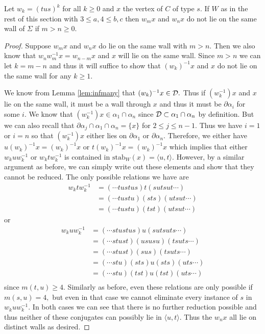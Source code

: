 \documentclass[class=book, crop=false,12 pt]{standalone}
\begin{document}
\begin{lemma}
	\label{lem:samewall}
	Let $w_k=(tus)^k$ for all $k\ge 0$ and $x$ the vertex of $C$ of type $s.$ If $W$ as in the rest of this section with $3\le a,4\le b,c$ then $w_mx$ and $w_nx$ do not lie on the same wall of $\Sigma$ if $m>n\ge 0.$
\end{lemma}
\begin{proof}
	Suppose $w_mx$ and $w_nx$ do lie on the same wall with $m>n.$ Then we also know that $w_nw^{-1}_mx=w_{n-m}x$ and $x$ will lie on the same wall. Since $m>n$ we can let $k=m-n$ and thus it will suffice to show that $(w_k)^{-1}x$ and $x$ do not lie on the same wall for any $k\ge 1.$
	
We know from Lemma \ref{lem:infmany} that $(w_k)^{-1}x\in \mathcal{D}.$ Thus if $(w_k^{-1})x$ and $x$ lie on the same wall, it must be a wall through $x$ and thus it must be $\partial\alpha_i$ for some $i.$ We know that $(w_k^{-1})x\in \alpha_1\cap \alpha_n$ since $\mathcal{D}\subset \alpha_1\cap \alpha_n$ by definition. But we can also recall that $\partial\alpha_j\cap \alpha_1\cap \alpha_n=\{x\}$ for $2\le j\le n-1.$ Thus we have $i=1$ or $i=n$ so that $(w_k^{-1})x$ either lies on $\partial\alpha_1$ or $\partial\alpha_n.$  Therefore, we either have $u(w_k)^{-1}x=(w_k)^{-1}x$ or $t(w_k)^{-1}x=(w_k)^{-1}x$ which implies that either $w_kuw_k^{-1}$ or $w_ktw_k^{-1}$ is contained in $\mathrm{stab}_W(x)=\langle u,t \rangle.$ However, by a similar argument as before, we can simply write out these elements and show that they cannot be reduced. The only possible relations we have are
\begin{align*}
	w_ktw_k^{-1}&=(\cdots tustus)t(sutsut\cdots)\\
		    &=(\cdots tustu)(sts)(utsut\cdots)\\
		    &=(\cdots tustu)(tst)(utsut\cdots)
\end{align*}
or
\begin{align*}
	w_kuw_k^{-1}&=(\cdots stustus)u(sutsuts\cdots)\\
		    &=(\cdots stust)(ususu)(tsuts\cdots)\\
		    &=(\cdots stust)(sus)(tsuts\cdots)\\
		    &=(\cdots stu)(sts)u(sts)(uts\cdots)\\
		    &=(\cdots stu)(tst)u(tst)(uts\cdots)\\
\end{align*}
since $m(t,u)\ge 4.$ Similarly as before, even these relations are only possible if $m(s,u)=4,$ but even in that case we cannot eliminate every instance of $s$ in $w_kuw_k^{-1}.$ In both cases we can see that there is no further reduction possible and thus neither of these conjugates can possibly lie in $\langle u,t \rangle.$ Thus the $w_nx$ all lie on distinct walls as desired.
\end{proof}
\end{document}

